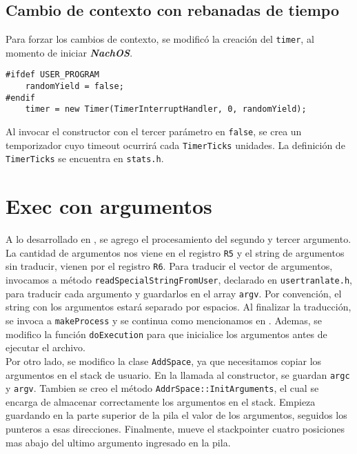 \subsection*{Cambio de contexto con rebanadas de tiempo}
Para forzar los cambios de contexto, se modificó la creación del \texttt{timer}, al momento de iniciar \textit{\textbf{NachOS}}.
\begin{lstlisting}[style=C]
#ifdef USER_PROGRAM
    randomYield = false;
#endif
    timer = new Timer(TimerInterruptHandler, 0, randomYield);
\end{lstlisting}
Al invocar el constructor con  el tercer parámetro en \texttt{false}, se crea un temporizador cuyo timeout ocurrirá cada \texttt{TimerTicks} unidades. La definición de \texttt{TimerTicks} se encuentra en \texttt{stats.h}.
\section{Exec con argumentos}
A lo desarrollado en , se agrego el procesamiento del segundo y tercer argumento. La cantidad de argumentos nos viene en el registro \texttt{R5} y el string de argumentos sin traducir, vienen por el registro \texttt{R6}. Para traducir el vector de argumentos, invocamos a método \texttt{readSpecialStringFromUser}, declarado en \texttt{usertranlate.h}, para traducir cada argumento y guardarlos en el array \texttt{argv}. Por convención, el string con los argumentos estará separado por espacios. Al finalizar la traducción, se invoca a \texttt{makeProcess} y se continua como mencionamos en . Ademas, se modifico la función \texttt{doExecution} para que inicialice los argumentos antes de ejecutar el archivo.\\
Por otro lado, se modifico la clase \texttt{AddSpace}, ya que necesitamos copiar los argumentos en el stack de usuario. En la llamada al constructor, se guardan \texttt{argc} y \texttt{argv}. Tambien se creo el método \texttt{AddrSpace::InitArguments}, el cual se encarga de almacenar correctamente los argumentos en el stack. Empieza guardando en la parte superior de la pila el valor de los argumentos, seguidos los punteros a esas direcciones. Finalmente, mueve el stackpointer cuatro posiciones mas abajo del ultimo argumento ingresado en la pila. 
